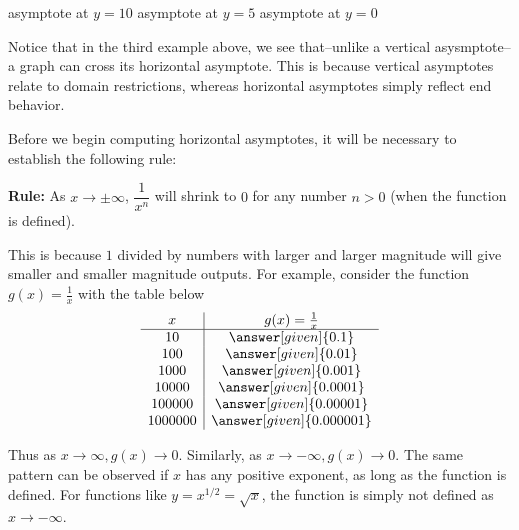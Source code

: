 \documentclass{ximera}
\begin{document}
{\scriptsize \hfill asymptote at $y=10$ \hfill asymptote at $y=5$ \hfill asymptote at $y=0$\hfill}

Notice that in the third example above, we see that--unlike a vertical asysmptote--a graph can cross its horizontal asymptote. This is because vertical asymptotes relate to domain restrictions, whereas horizontal asymptotes simply reflect end behavior.
%
%
%
%

Before we begin computing horizontal asymptotes, it will be necessary to establish the following rule:
\vspace{.1in}

\textbf{Rule:} As $x\rightarrow\pm\infty$, $\dfrac{1}{x^n}$ will shrink to $0$ for any number $n>0$ (when the function is defined).
\vspace{.1in}

This is because $1$ divided by numbers with larger and larger magnitude will give smaller and smaller magnitude outputs. For example, consider the function $g(x) = \frac{1}{x}$ with the table below
	\[ \begin{array}{c|c}
		x       & g(x)=\frac{1}{x} \\\hline
		10      & \answer[given]{0.1} \\ 
		100     & \answer[given]{0.01} \\
		1000    & \answer[given]{0.001} \\
		10000   & \answer[given]{0.0001} \\
		100000  & \answer[given]{0.00001}\\
		1000000 & \answer[given]{0.000001}
	\end{array} \]

Thus as $x\rightarrow\infty,g(x)\rightarrow 0$. Similarly, as $x\rightarrow -\infty,g(x)\rightarrow 0$. The same pattern can be observed if $x$ has any positive exponent, as long as the function is defined. For functions like $y=x^{1/2}=\sqrt{x}$, the function is simply not defined as $x\rightarrow -\infty$.
\end{document}
